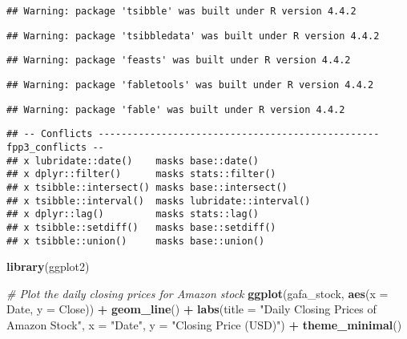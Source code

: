 \documentclass[
]{article}
\newenvironment{Shaded}{\begin{snugshade}}{\end{snugshade}}
\newcommand{\AttributeTok}[1]{\textcolor[rgb]{0.13,0.29,0.53}{#1}}
\newcommand{\CommentTok}[1]{\textcolor[rgb]{0.56,0.35,0.01}{\textit{#1}}}
\newcommand{\FunctionTok}[1]{\textcolor[rgb]{0.13,0.29,0.53}{\textbf{#1}}}
\newcommand{\NormalTok}[1]{#1}
\newcommand{\SpecialCharTok}[1]{\textcolor[rgb]{0.81,0.36,0.00}{\textbf{#1}}}
\newcommand{\StringTok}[1]{\textcolor[rgb]{0.31,0.60,0.02}{#1}}
\begin{document}
\begin{verbatim}
## Warning: package 'tsibble' was built under R version 4.4.2
\end{verbatim}

\begin{verbatim}
## Warning: package 'tsibbledata' was built under R version 4.4.2
\end{verbatim}

\begin{verbatim}
## Warning: package 'feasts' was built under R version 4.4.2
\end{verbatim}

\begin{verbatim}
## Warning: package 'fabletools' was built under R version 4.4.2
\end{verbatim}

\begin{verbatim}
## Warning: package 'fable' was built under R version 4.4.2
\end{verbatim}

\begin{verbatim}
## -- Conflicts ------------------------------------------------- fpp3_conflicts --
## x lubridate::date()    masks base::date()
## x dplyr::filter()      masks stats::filter()
## x tsibble::intersect() masks base::intersect()
## x tsibble::interval()  masks lubridate::interval()
## x dplyr::lag()         masks stats::lag()
## x tsibble::setdiff()   masks base::setdiff()
## x tsibble::union()     masks base::union()
\end{verbatim}

\begin{Shaded}
\begin{Highlighting}[]
\FunctionTok{library}\NormalTok{(ggplot2)}

\CommentTok{\# Plot the daily closing prices for Amazon stock}
\FunctionTok{ggplot}\NormalTok{(gafa\_stock, }\FunctionTok{aes}\NormalTok{(}\AttributeTok{x =}\NormalTok{ Date, }\AttributeTok{y =}\NormalTok{ Close)) }\SpecialCharTok{+}
  \FunctionTok{geom\_line}\NormalTok{() }\SpecialCharTok{+}
  \FunctionTok{labs}\NormalTok{(}\AttributeTok{title =} \StringTok{"Daily Closing Prices of Amazon Stock"}\NormalTok{, }\AttributeTok{x =} \StringTok{"Date"}\NormalTok{, }\AttributeTok{y =} \StringTok{"Closing Price (USD)"}\NormalTok{) }\SpecialCharTok{+}
  \FunctionTok{theme\_minimal}\NormalTok{()}
\end{Highlighting}
\end{Shaded}
\end{document}
